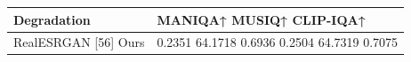 \begin{tabular}{ll}
\toprule
Degradation & MANIQA↑ MUSIQ↑ CLIP-IQA↑ \\
\midrule
RealESRGAN [56] Ours & 0.2351 64.1718 0.6936 0.2504 64.7319 0.7075 \\
\bottomrule
\end{tabular}

